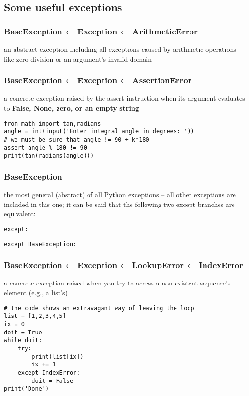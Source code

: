 \documentclass[11pt]{article}
\begin{document}
\subsection{Some useful exceptions}
\label{sec:orgc5bb0ef}
\subsubsection{BaseException ← Exception ← ArithmeticError}
\label{sec:orgfed91c8}
an abstract exception including all exceptions caused by arithmetic
operations like zero division or an argument’s invalid domain

\subsubsection{BaseException ← Exception ← AssertionError}
\label{sec:org343fb27}
a concrete exception raised by the assert instruction when its
argument evaluates to \textbf{False, None, zero, or an empty string}

\begin{verbatim}
from math import tan,radians
angle = int(input('Enter integral angle in degrees: '))
# we must be sure that angle != 90 + k*180
assert angle % 180 != 90
print(tan(radians(angle)))
\end{verbatim}

\subsubsection{BaseException}
\label{sec:orgda08fa7}
the most general (abstract) of all Python exceptions – all other
exceptions are included in this one; it can be said that the following
two except branches are equivalent:

\texttt{except:}

\texttt{except BaseException:}

\subsubsection{BaseException ← Exception ← LookupError ← IndexError}
\label{sec:org59d4a52}
a concrete exception raised when you try to access a non-existent
sequence’s element (e.g., a list’s)

\begin{verbatim}
# the code shows an extravagant way of leaving the loop
list = [1,2,3,4,5]
ix = 0
doit = True
while doit:
    try:
        print(list[ix])
        ix += 1
    except IndexError:
        doit = False
print('Done')
\end{verbatim}
\end{document}
